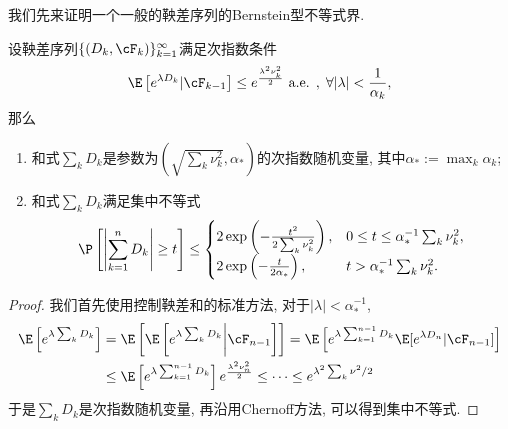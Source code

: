 我们先来证明一个一般的鞅差序列的Bernstein型不等式界. 
\begin{theorem}
	设鞅差序列$\{(D_k, \cF_k)\}_{k=1}^{\infty}$满足次指数条件
	\begin{equation*}
		\E \left[ e^{\lambda D_k} | \cF_{k-1} \right] 
		\leq e^{\frac{\lambda^2 \nu_k^2}{2}} \text{ a.e. },\; \forall |\lambda| < \frac{1}{\alpha_k}, 
	\end{equation*}
	那么
	\begin{enumerate}[label=(\arabic*)]
		\item 和式$\sum_k D_k$是参数为$\left( \sqrt{\sum_k \nu_k^2}, \alpha_* \right)$的次指数随机变量, 其中$\alpha_* := \max_k \alpha_k$; 
		\item 和式$\sum_k D_k$满足集中不等式
			\begin{equation*}
				\P \left[ \left| \sum_{k=1}^n D_k \right| \geq t \right] \leq 
				\begin{cases}
					2 \exp\left( -\frac{t^2}{2 \sum_k \nu_k^2} \right), & 0 \leq t \leq \alpha_*^{-1} \sum_k \nu_k^2, \\
					2 \exp\left(- \frac{t}{2 \alpha_*}\right), & t > \alpha_*^{-1} \sum_k \nu_k^2.
				\end{cases}
			\end{equation*}
	\end{enumerate}
\end{theorem}
\begin{proof}
	我们首先使用控制鞅差和的标准方法, 对于$|\lambda| < \alpha_*^{-1}$, 
	\begin{align*}
		\E\left[ e^{\lambda \sum_k D_k} \right]
		&= \E\left[ \E\left[ e^{\lambda \sum_k D_k} \bigg| \cF_{n-1} \right] \right] 
		= \E \left[ e^{\lambda \sum_{k=1}^{n-1} D_k} \E [e^{\lambda D_n} | \cF_{n-1}] \right] \\
		&\leq \E \left[ e^{\lambda \sum_{k=1}^{n-1} D_k} \right]  e^{\frac{\lambda^2 \nu_n^2}{2}} 
		\leq \cdots
		\leq e^{\lambda^2 \sum_k \nu^2 / 2}
	\end{align*}
	于是$\sum_k D_k$是次指数随机变量, 再沿用Chernoff方法, 可以得到集中不等式. 
\end{proof}




